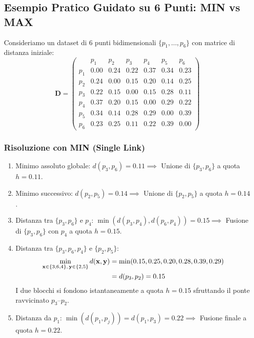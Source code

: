 \FloatBarrier
\subsection{Esempio Pratico Guidato su 6 Punti: MIN vs MAX}

Consideriamo un dataset di 6 punti bidimensionali $\{p_1, \dots, p_6\}$ con matrice di distanza iniziale:
\begin{equation}
\mathbf{D} = 
\begin{pmatrix}
 & p_1 & p_2 & p_3 & p_4 & p_5 & p_6 \\
p_1 & 0.00 & 0.24 & 0.22 & 0.37 & 0.34 & 0.23 \\
p_2 & 0.24 & 0.00 & 0.15 & 0.20 & 0.14 & 0.25 \\
p_3 & 0.22 & 0.15 & 0.00 & 0.15 & 0.28 & 0.11 \\
p_4 & 0.37 & 0.20 & 0.15 & 0.00 & 0.29 & 0.22 \\
p_5 & 0.34 & 0.14 & 0.28 & 0.29 & 0.00 & 0.39 \\
p_6 & 0.23 & 0.25 & 0.11 & 0.22 & 0.39 & 0.00
\end{pmatrix}
\end{equation}

\subsubsection{Risoluzione con MIN (Single Link)}
\begin{enumerate}
    \item Minimo assoluto globale: $d(p_3, p_6) = 0.11 \implies$ Unione di $\{p_3, p_6\}$ a quota $h = 0.11$.
    \item Minimo successivo: $d(p_2, p_5) = 0.14 \implies$ Unione di $\{p_2, p_5\}$ a quota $h = 0.14$.
    \item Distanza tra $\{p_3, p_6\}$ e $p_4$: $\min(d(p_3, p_4), d(p_6, p_4)) = 0.15 \implies$ Fusione di $\{p_3, p_6\}$ con $p_4$ a quota $h = 0.15$.
    \item Distanza tra $\{p_3, p_6, p_4\}$ e $\{p_2, p_5\}$:
    \begin{align}
        \min_{\mathbf{x} \in \{3,6,4\}, \, \mathbf{y} \in \{2,5\}} d(\mathbf{x}, \mathbf{y}) &= \min(0.15, 0.25, 0.20, 0.28, 0.39, 0.29) \notag \\
        &= d(p_3, p_2) = 0.15
    \end{align}
    I due blocchi si fondono istantaneamente a quota $h = 0.15$ sfruttando il ponte ravvicinato $p_3$--$p_2$.
    \item Distanza da $p_1$: $\min(d(p_1, p_j)) = d(p_1, p_3) = 0.22 \implies$ Fusione finale a quota $h = 0.22$.
\end{enumerate}

